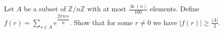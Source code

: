 Let $A$ be a subset of $\mathbb{Z}/n\mathbb{Z}$ with at most $\frac{\ln(n)}{100}$ elements.
Define $f(r)=\sum_{s\in A} e^{\dfrac{2 \pi i r s}{n}}$. Show that for some $r \ne 0$ we have $|f(r)| \geq \frac{|A|}{2}$.